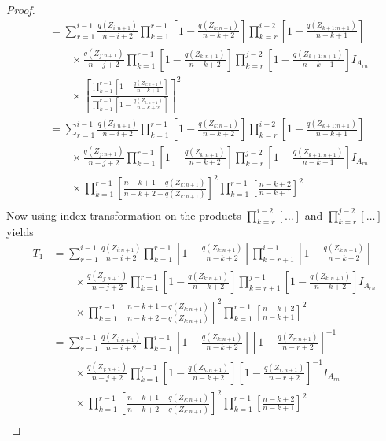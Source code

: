 \begin{proof}
\begin{align*}
		&= \sum\limits_{r=1}^{i-1} \frac{q(Z_{i:n+1})}{n-i+2} \prod_{k=1}^{r-1}\left[1-\frac{q(Z_{k:n+1})}{n-k+2}\right]\prod_{k=r}^{i-2}\left[1-\frac{q(Z_{k+1:n+1})}{n-k+1}\right]\\
		& \qquad \times \frac{q(Z_{j:n+1})}{n-j+2} \prod_{k=1}^{r-1}\left[1-\frac{q(Z_{k:n+1})}{n-k+2}\right]\prod_{k=r}^{j-2}\left[1-\frac{q(Z_{k+1:n+1})}{n-k+1}\right]I_{A_{rn}}\\
		& \qquad \times \left[\frac{\prod_{k=1}^{r-1}\left[1-\frac{q(Z_{k:n+1})}{n-k+1}\right]}{\prod_{k=1}^{r-1}\left[1-\frac{q(Z_{k:n+1})}{n-k+2}\right]}\right]^2\\
		&= \sum\limits_{r=1}^{i-1} \frac{q(Z_{i:n+1})}{n-i+2} \prod_{k=1}^{r-1}\left[1-\frac{q(Z_{k:n+1})}{n-k+2}\right]\prod_{k=r}^{i-2}\left[1-\frac{q(Z_{k+1:n+1})}{n-k+1}\right]\\
		& \qquad \times \frac{q(Z_{j:n+1})}{n-j+2} \prod_{k=1}^{r-1}\left[1-\frac{q(Z_{k:n+1})}{n-k+2}\right]\prod_{k=r}^{j-2}\left[1-\frac{q(Z_{k+1:n+1})}{n-k+1}\right]I_{A_{rn}}\\
		& \qquad \times \prod_{k=1}^{r-1}\left[ \frac{n-k+1-q(Z_{k:n+1})}{n-k+2-q(Z_{k:n+1})}\right]^2\prod_{k=1}^{r-1}\left[ \frac{n-k+2}{n-k+1}\right]^2\\
\end{align*}
%
Now using index transformation on the products $\prod_{k=r}^{i-2}[\ldots]$ and $\prod_{k=r}^{j-2}[\ldots]$ yields
\begin{align*}		
	T_1 &= \sum\limits_{r=1}^{i-1} \frac{q(Z_{i:n+1})}{n-i+2} \prod_{k=1}^{r-1}\left[1-\frac{q(Z_{k:n+1})}{n-k+2}\right]\prod_{k=r+1}^{i-1}\left[1-\frac{q(Z_{k:n+1})}{n-k+2}\right]\\
	& \qquad \times \frac{q(Z_{j:n+1})}{n-j+2} \prod_{k=1}^{r-1}\left[1-\frac{q(Z_{k:n+1})}{n-k+2}\right]\prod_{k=r+1}^{j-1}\left[1-\frac{q(Z_{k:n+1})}{n-k+2}\right]I_{A_{rn}}\\
	& \qquad \times \prod_{k=1}^{r-1}\left[ \frac{n-k+1-q(Z_{k:n+1})}{n-k+2-q(Z_{k:n+1})}\right]^2\prod_{k=1}^{r-1}\left[ \frac{n-k+2}{n-k+1}\right]^2\\
    &= \sum\limits_{r=1}^{i-1} \frac{q(Z_{i:n+1})}{n-i+2} \prod_{k=1}^{i-1}\left[1-\frac{q(Z_{k:n+1})}{n-k+2}\right]\left[1-\frac{q(Z_{r:n+1})}{n-r+2}\right]^{-1}\\
	& \qquad \times \frac{q(Z_{j:n+1})}{n-j+2} \prod_{k=1}^{j-1}\left[1-\frac{q(Z_{k:n+1})}{n-k+2}\right]\left[1-\frac{q(Z_{r:n+1})}{n-r+2}\right]^{-1}I_{A_{rn}}\\
	& \qquad \times \prod_{k=1}^{r-1}\left[ \frac{n-k+1-q(Z_{k:n+1})}{n-k+2-q(Z_{k:n+1})}\right]^2\prod_{k=1}^{r-1}\left[ \frac{n-k+2}{n-k+1}\right]^2\\

\end{align*}
\end{proof}
